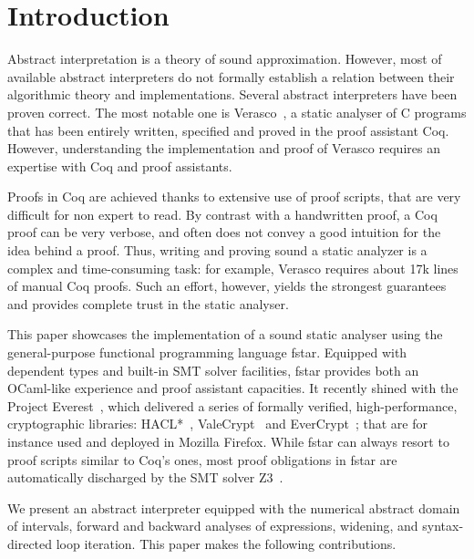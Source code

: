 \section{Introduction}

Abstract interpretation is a theory of sound approximation.
%
However, most of available abstract interpreters do not formally
establish a relation between their algorithmic theory and
implementations.
%
Several abstract interpreters have been proven correct. The most
notable one is Verasco~\cite{POPL15:Jourdan:al}, a static analyser of C
programs that has been entirely written, specified and proved in the
proof assistant Coq.
%
However, understanding the implementation and proof of Verasco
requires an expertise with Coq and proof assistants.

Proofs in Coq are achieved thanks to extensive use of proof scripts,
that are very difficult for non expert to read.
%
By contrast with a handwritten proof, a Coq proof can be very verbose,
and often does not convey a good intuition for the idea behind a
proof.
%
Thus, writing and proving sound a static analyzer is a complex and
time-consuming task: for example, Verasco requires about 17k
lines~\cite{POPL15:Jourdan:al} of manual Coq proofs.
%
Such an effort, however, yields the strongest guarantees and provides
complete trust in the static analyser.

This paper showcases the implementation of a sound static
analyser using the general-purpose functional programming language
\gls{fstar}.
%
Equipped with dependent types and built-in SMT solver facilities,
\gls{fstar} provides both an OCaml-like experience and proof assistant
capacities. It recently shined with the Project
Everest~\cite{project-everest}, which delivered a series of formally
verified, high-performance, cryptographic libraries:
%
HACL*~\cite{haclstar}, ValeCrypt~\cite{bond2017vale} and
EverCrypt~\cite{protzenko2020evercrypt}; that are for instance used and
deployed in Mozilla Firefox.
%
While \gls{fstar} can always resort to proof scripts similar to Coq's
ones, most proof obligations in \gls{fstar} are automatically
discharged by the SMT solver Z3~\cite{z3}.

We present an abstract interpreter equipped with the numerical
abstract domain of intervals, forward and backward analyses of
expressions, widening, and syntax-directed loop iteration.
%
This paper makes the following contributions.

